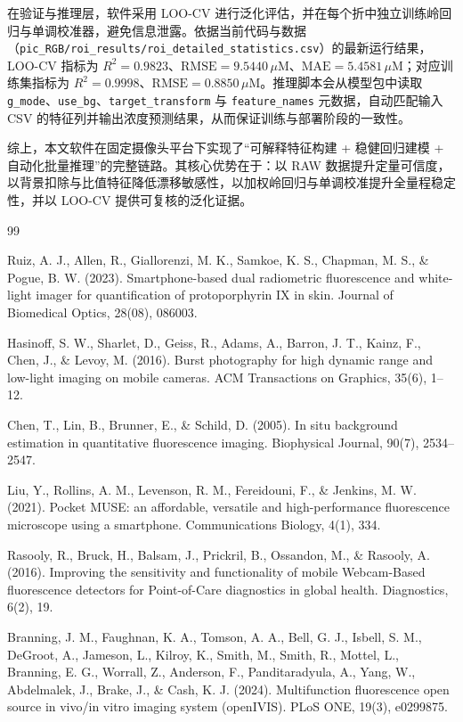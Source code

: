 ﻿\documentclass[12pt,a4paper]{ctexart}
\begin{document}
在验证与推理层，软件采用 LOO-CV 进行泛化评估，并在每个折中独立训练岭回归与单调校准器，避免信息泄露。依据当前代码与数据（\texttt{pic\_RGB/roi\_results/roi\_detailed\_statistics.csv}）的最新运行结果，LOO-CV 指标为 $R^2=0.9823$、$\mathrm{RMSE}=9.5440\,\mu\mathrm{M}$、$\mathrm{MAE}=5.4581\,\mu\mathrm{M}$；对应训练集指标为 $R^2=0.9998$、$\mathrm{RMSE}=0.8850\,\mu\mathrm{M}$。推理脚本会从模型包中读取 \texttt{g\_mode}、\texttt{use\_bg}、\texttt{target\_transform} 与 \texttt{feature\_names} 元数据，自动匹配输入 CSV 的特征列并输出浓度预测结果，从而保证训练与部署阶段的一致性。

综上，本文软件在固定摄像头平台下实现了“可解释特征构建 + 稳健回归建模 + 自动化批量推理”的完整链路。其核心优势在于：以 RAW 数据提升定量可信度，以背景扣除与比值特征降低漂移敏感性，以加权岭回归与单调校准提升全量程稳定性，并以 LOO-CV 提供可复核的泛化证据。

\begin{thebibliography}{99}

Ruiz, A. J., Allen, R., Giallorenzi, M. K., Samkoe, K. S., Chapman, M. S., \& Pogue, B. W. (2023). 
Smartphone-based dual radiometric fluorescence and white-light imager for quantification of protoporphyrin IX in skin. 
Journal of Biomedical Optics, 28(08), 086003. 

Hasinoff, S. W., Sharlet, D., Geiss, R., Adams, A., Barron, J. T., Kainz, F., Chen, J., \& Levoy, M. (2016). 
Burst photography for high dynamic range and low-light imaging on mobile cameras. 
ACM Transactions on Graphics, 35(6), 1–12.

Chen, T., Lin, B., Brunner, E., \& Schild, D. (2005). 
In situ background estimation in quantitative fluorescence imaging. 
Biophysical Journal, 90(7), 2534–2547. 

Liu, Y., Rollins, A. M., Levenson, R. M., Fereidouni, F., \& Jenkins, M. W. (2021). 
Pocket MUSE: an affordable, versatile and high-performance fluorescence microscope using a smartphone. 
Communications Biology, 4(1), 334.

Rasooly, R., Bruck, H., Balsam, J., Prickril, B., Ossandon, M., \& Rasooly, A. (2016). 
Improving the sensitivity and functionality of mobile Webcam-Based fluorescence detectors for Point-of-Care diagnostics in global health. 
Diagnostics, 6(2), 19. 

Branning, J. M., Faughnan, K. A., Tomson, A. A., Bell, G. J., Isbell, S. M., DeGroot, A., Jameson, L., Kilroy, K., Smith, M., Smith, R., Mottel, L., Branning, E. G., Worrall, Z., Anderson, F., Panditaradyula, A., Yang, W., Abdelmalek, J., Brake, J., \& Cash, K. J. (2024). 
Multifunction fluorescence open source in vivo/in vitro imaging system (openIVIS). 
PLoS ONE, 19(3), e0299875.

\end{thebibliography}
\end{document}
